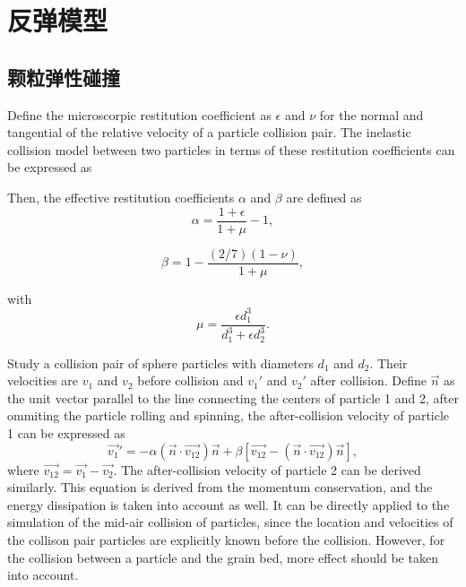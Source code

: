 \documentclass[12pt,a4paper]{article}
\begin{document}
\section{反弹模型}
\subsection{颗粒弹性碰撞}
Define the microscorpic restitution coefficient as $\epsilon$ and $\nu$ for the normal and tangential of the relative velocity of a particle collision pair. The inelastic collision model between two particles in terms of these restitution coefficients can be expressed as

Then, the effective restitution coefficients $\alpha$ and $\beta$ are defined as
\begin{equation}
    \alpha = \frac{1 + \epsilon}{1 + \mu} - 1,
\end{equation}

\begin{equation}
    \beta = 1 - \frac{(2/7)(1 - \nu)}{1 + \mu},
\end{equation}

with
\begin{equation}
    \mu = \frac{\epsilon d_1^3}{d_1^3 + \epsilon d_2^3}.
\end{equation}

Study a collision pair of sphere particles with diameters $d_1$ and $d_2$. Their velocities are $v_1$ and $v_2$ before collision and $v_1'$ and $v_2'$ after collision. Define $\overrightarrow{n}$ as the unit vector parallel to the line connecting the centers of particle 1 and 2, after ommiting the particle rolling and spinning, the after-collision velocity of particle 1 can be expressed as
\begin{equation}
    \overrightarrow{v_1}' = - \alpha \left ( \overrightarrow{n} \cdot \overrightarrow{v_{12}} \right ) \overrightarrow{n} + \beta \left [ \overrightarrow{v_{12}} - \left ( \overrightarrow{n} \cdot \overrightarrow{v_{12}} \right ) \overrightarrow{n} \right ],
\end{equation}
where $\overrightarrow{v_{12}} = \overrightarrow{v_1} - \overrightarrow{v_2}$. The after-collision velocity of particle 2 can be derived similarly. This equation is derived from the momentum conservation, and the energy dissipation is taken into account as well. It can be directly applied to the simulation of the mid-air collision of particles, since the location and velocities of the collison pair particles are explicitly known before the collision. However, for the collision between a particle and the grain bed, more effect should be taken into account.
\end{document}

